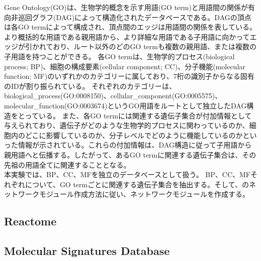 \documentclass[a4paper,12pt]{jsreport}
\begin{document}
Gene Ontology(GO)は、生物学的概念を示す用語(GO term)と用語間の関係が有向非巡回グラフ(DAG)によって構造化されたデータベースである。DAGの頂点は各GO termによって構成され、頂点間のエッジは用語間の関係を表している。より概括的な用語である親用語から、より詳細な用語である子用語に向かってエッジが引かれており、ルート以外のどのGO termも複数の親用語、または複数の子用語を持つことができる。
各GO termは、生物学的プロセス(biological process; BP)、細胞の構成要素(cellular component; CC)、分子機能(molecular function; MF)のいずれかのカテゴリーに属しており、7桁の識別子からなる固有のIDが割り振られている。
それぞれのカテゴリーは、biological\_process(GO:0008150)、cellular\_component(GO:0005575)、molecular\_function(GO:0003674)というGO用語をルートとして独立したDAG構造をとっている。
また、各GO termには関連する遺伝子集合が付加情報として与えられており、遺伝子がどのような生物学的プロセスに関わっているのか、細胞内のどこに影響しているのか、分子レベルでどのように機能しているのかといった情報が示されている。これらの付加情報は、DAG構造に従って子用語から親用語へと伝播する。したがって、あるGO termに関連する遺伝子集合は、その先祖の用語全てに関連することとなる。\\
本実験では、BP、CC、MFを独立のデータベースとして扱う。 BP、CC、MFそれぞれについて、GO termごとに関連する遺伝子集合を抽出する。そして、のネットワークモジュール作成方法に従い、ネットワークモジュールを作成する。



\subsection{Reactome}
\begin{comment}
\#\#\#\#\#\#\#\#\#\#\# \\
・reactome説明\\
パスウェイと親子関係があるDAG構造を取ること\\
ルートがいくつかあること\\
アノテーション情報があること\\
子用語のアノテーションは親用語のアノテーションになること\\
遺伝子集合と親子関係を抽出すること\\
\#\#\#\#\#\#\#\#\#\#\# \\
\end{comment}

\subsection{Molecular Signatures Database}
\begin{comment}
\#\#\#\#\#\#\#\#\#\#\# \\
・MSigDB説明\\
いくつかの要素で遺伝子集合があること\\
その中から使うもの\\
遺伝子集合を抽出すること\\
\#\#\#\#\#\#\#\#\#\#\# \\
\end{comment}
\end{document}
